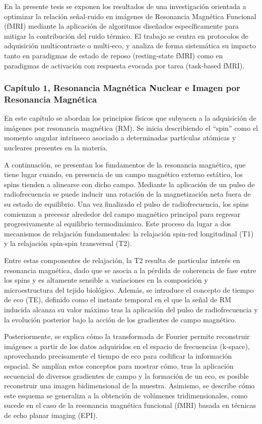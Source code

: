     \justifying
    


En la presente tesis se exponen los resultados de una investigación orientada a optimizar la relación señal-ruido en imágenes de Resonancia Magnética Funcional (fMRI) mediante la aplicación de algoritmos diseñados específicamente para mitigar la contribución del ruido térmico. El trabajo se centra en protocolos de adquisición multicontraste o multi-eco, y analiza de forma sistemática su impacto tanto en paradigmas de estado de reposo (resting-state fMRI) como en paradigmas de activación con respuesta evocada por tarea (task-based fMRI).

\subsubsection{Capítulo 1, Resonancia Magnética Nuclear
e Imagen por Resonancia Magnética}

En este capítulo se abordan los principios físicos que subyacen a la adquisición de imágenes por resonancia magnética (RM). Se inicia describiendo el “spin” como el momento angular intrínseco asociado a determinadas partículas atómicas y nucleares presentes en la materia.

A continuación, se presentan los fundamentos de la resonancia magnética, que tiene lugar cuando, en presencia de un campo magnético externo estático, los spins tienden a alinearse con dicho campo. Mediante la aplicación de un pulso de radiofrecuencia se puede inducir una rotación de la magnetización neta fuera de su estado de equilibrio. Una vez finalizado el pulso de radiofrecuencia, los spins comienzan a precesar alrededor del campo magnético principal para regresar progresivamente al equilibrio termodinámico. Este proceso da lugar a dos mecanismos de relajación fundamentales: la relajación spin-red longitudinal (T1) y la relajación spin-spin transversal (T2). 

Entre estas componentes de relajación, la T2 resulta de particular interés en resonancia magnética, dado que se asocia a la pérdida de coherencia de fase entre los spins y es altamente sensible a variaciones en la composición y microestructura del tejido biológico. Además, se introduce el concepto de tiempo de eco (TE), definido como el instante temporal en el que la señal de RM inducida alcanza su valor máximo tras la aplicación del pulso de radiofrecuencia y la evolución posterior bajo la acción de los gradientes de campo magnético.

Posteriormente, se explica cómo la transformada de Fourier permite reconstruir imágenes a partir de los datos adquiridos en el espacio de frecuencias (k-space), aprovechando precisamente el tiempo de eco para codificar la información espacial. Se amplían estos conceptos para mostrar cómo, tras la aplicación secuencial de diversos gradientes de campo y la formación de un eco, es posible reconstruir una imagen bidimensional de la muestra. Asimismo, se describe cómo este esquema se generaliza a la obtención de volúmenes tridimensionales, como sucede en el caso de la resonancia magnética funcional (fMRI) basada en técnicas de echo planar imaging (EPI).



